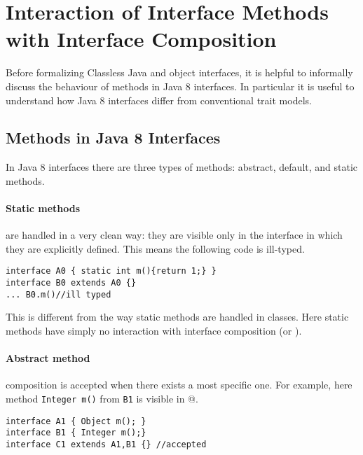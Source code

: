 \section{Interaction of Interface Methods with Interface Composition}
Before formalizing Classless Java and object interfaces, it is helpful
to informally discuss the behaviour of methods in Java 8
interfaces. In particular it is useful to understand how Java 8
interfaces differ from conventional trait models.


\subsection{Methods in Java 8 Interfaces}
In Java 8 interfaces there are three types of methods: abstract, default, and
static methods.

\paragraph{Static methods} are handled in a very clean way: they are visible only in
  the interface in which they are explicitly defined. This means the following code
  is ill-typed.
\begin{lstlisting}
interface A0 { static int m(){return 1;} }
interface B0 extends A0 {}
... B0.m()//ill typed
\end{lstlisting}
This is different from the way static methods are handled in classes. Here
static methods have simply no interaction with interface
composition (\Q@extends@ or \Q@implements@).

\paragraph{Abstract method} composition is accepted when there exists a most specific one.
  For example, here method \texttt{Integer m()} from \texttt{B1} is visible in @.
\begin{lstlisting}
interface A1 { Object m(); }
interface B1 { Integer m();}
interface C1 extends A1,B1 {} //accepted
\end{lstlisting}

